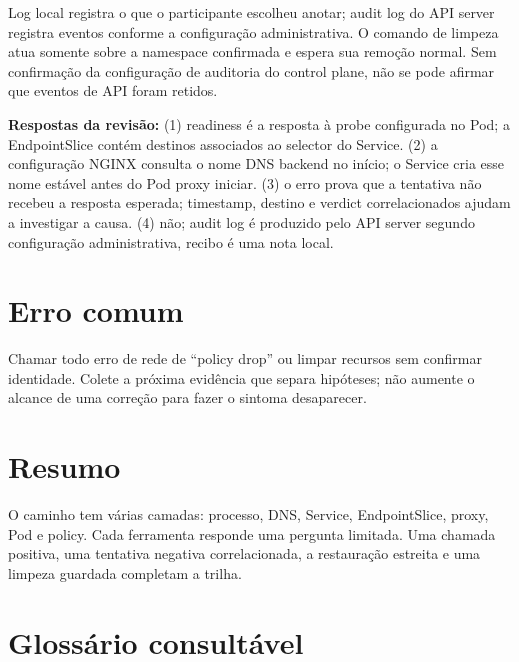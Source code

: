 \documentclass[12pt,openany,oneside,a4paper,chapter=TITLE,english,brazil]{abntex2}
\begin{document}
Log local registra o que o participante escolheu anotar; audit log do API server registra eventos conforme a configuração administrativa. O comando de limpeza atua somente sobre a namespace confirmada e espera sua remoção normal. Sem confirmação da configuração de auditoria do control plane, não se pode afirmar que eventos de API foram retidos.

\textbf{Respostas da revisão:} (1) readiness é a resposta à probe configurada no Pod; a EndpointSlice contém destinos associados ao selector do Service. (2) a configuração NGINX consulta o nome DNS backend no início; o Service cria esse nome estável antes do Pod proxy iniciar. (3) o erro prova que a tentativa não recebeu a resposta esperada; timestamp, destino e verdict correlacionados ajudam a investigar a causa. (4) não; audit log é produzido pelo API server segundo configuração administrativa, recibo é uma nota local.

\section*{Erro comum}\label{erro-comum}

Chamar todo erro de rede de ``policy drop'' ou limpar recursos sem confirmar identidade. Colete a próxima evidência que separa hipóteses; não aumente o alcance de uma correção para fazer o sintoma desaparecer.

\section*{Resumo}\label{resumo}

O caminho tem várias camadas: processo, DNS, Service, EndpointSlice, proxy, Pod e policy. Cada ferramenta responde uma pergunta limitada. Uma chamada positiva, uma tentativa negativa correlacionada, a restauração estreita e uma limpeza guardada completam a trilha.

\section*{Glossário consultável}\label{glossuxe1rio-consultuxe1vel}
\end{document}
